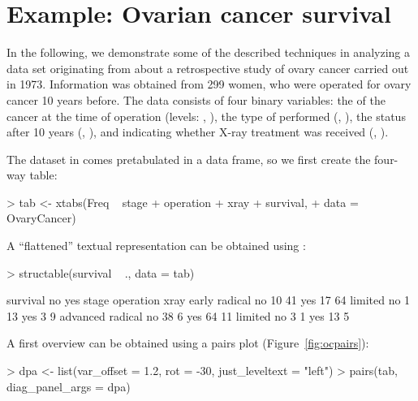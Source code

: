 \documentclass{Z}
\newcommand{\codefun}[1]{\code{#1()}}
\begin{document}
\section{Example: Ovarian cancer survival}
\label{sec:example}

In the following, we demonstrate some of the described techniques in
analyzing a data set originating from \citep{vcd:obel:1975}
\cite[taken from][]{vcd:andersen:1991} about a retrospective study of ovary cancer
carried out in 1973.  Information was obtained from 299 women, who
were operated for ovary cancer 10 years before. The data consists of
four binary variables: the  of the cancer at the time of
operation (levels: , ), the type of  performed
(, ), the  status after 10 years (, 
), and  indicating whether X-ray treatment was received (,
). 

The dataset in  comes pretabulated in a data frame, so we
first create the four-way table:

\begin{Schunk}
\begin{Sinput}
> tab <- xtabs(Freq ~ stage + operation + xray + survival, 
+     data = OvaryCancer)
\end{Sinput}
\end{Schunk}

\noindent A ``flattened'' textual representation can be obtained using \codefun{structable}:

\begin{Schunk}
\begin{Sinput}
> structable(survival ~ ., data = tab)
\end{Sinput}
\begin{Soutput}
                        survival no yes
stage    operation xray                
early    radical   no            10  41
                   yes           17  64
         limited   no             1  13
                   yes            3   9
advanced radical   no            38   6
                   yes           64  11
         limited   no             3   1
                   yes           13   5
\end{Soutput}
\end{Schunk}

\noindent A first overview can be obtained using a pairs plot (Figure~\ref{fig:ocpairs}):

\begin{Schunk}
\begin{Sinput}
> dpa <- list(var_offset = 1.2, rot = -30, just_leveltext = "left")
> pairs(tab, diag_panel_args = dpa)
\end{Sinput}
\end{Schunk}
\end{document}
